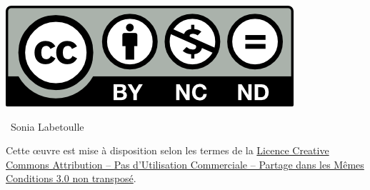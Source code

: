 \noi\includegraphics{by-nc-nd}

\noi\textcopyright~Sonia Labetoulle

\noi Cette \oe{}uvre est mise à disposition selon les termes de la 
\href{http://creativecommons.org/licenses/by-nc-sa/3.0/}{Licence 
Creative Commons Attribution -- Pas d’Utilisation Commerciale -- 
Partage dans les Mêmes Conditions 3.0 non transposé}.